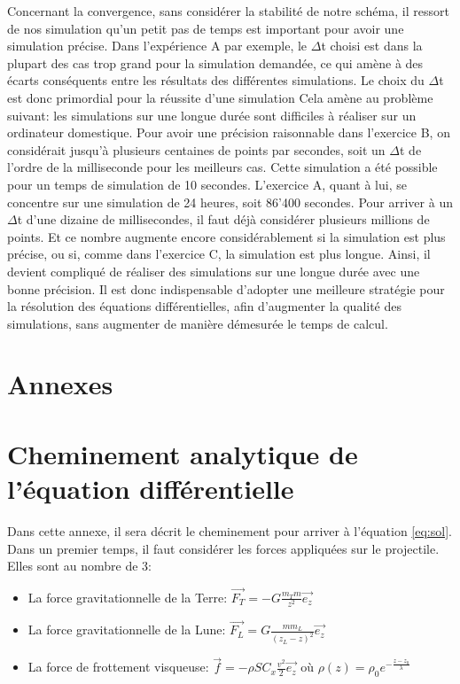 \documentclass[a4paper,12pt,twoside]{article}
\begin{document}
Concernant la convergence, sans considérer la stabilité de notre schéma, il ressort de nos simulation qu'un petit pas de temps est important pour avoir une simulation précise.
Dans l'expérience A par exemple, le $\Delta$t choisi est dans la plupart des cas trop grand pour la simulation demandée, ce qui amène à des écarts conséquents entre les résultats des différentes simulations.
Le choix du $\Delta$t est donc primordial pour la réussite d'une simulation
Cela amène au problème suivant: les simulations sur une longue durée sont difficiles à réaliser sur un ordinateur domestique.
Pour avoir une précision raisonnable dans l'exercice B, on considérait jusqu'à plusieurs centaines de points par secondes, soit un $\Delta$t de l'ordre de la milliseconde pour les meilleurs cas.
Cette simulation a été possible pour un temps de simulation de 10 secondes.
L'exercice A, quant à lui, se concentre sur une simulation de 24 heures, soit 86'400 secondes.
Pour arriver à un $\Delta$t d'une dizaine de millisecondes, il faut déjà considérer plusieurs millions de points.
Et ce nombre augmente encore considérablement si la simulation est plus précise, ou si, comme dans l'exercice C, la simulation est plus longue.
Ainsi, il devient compliqué de réaliser des simulations sur une longue durée avec une bonne précision.
Il est donc indispensable d'adopter une meilleure stratégie pour la résolution des équations différentielles, afin d'augmenter la qualité des simulations, sans augmenter de manière démesurée le temps de calcul.


\appendix
\section*{Annexes}
\section{Cheminement analytique de l'équation différentielle}
\label{ann:eq-diff}
Dans cette annexe, il sera décrit le cheminement pour arriver à l'équation \ref{eq:sol}.
Dans un premier temps, il faut considérer les forces appliquées sur le projectile.
Elles sont au nombre de 3:
\begin{itemize}
	\item La force gravitationnelle de la Terre: $\vec{F_T} = -G\frac{m_T m}{z^2}\vec{e_z}$ \cite{ref:ansermet}
	\item La force gravitationnelle de la Lune: $\vec{F_L} = G\frac{m m_L }{(z_L-z)^2}\vec{e_z}$
	\item La force de frottement visqueuse: $\vec{f} = - \rho S C_x \frac{v^2}{2}\vec{e_z}$ où $\rho (z) = \rho_0 e^{-\frac{z-z_0}{\lambda}}$
\end{itemize}
\end{document}
